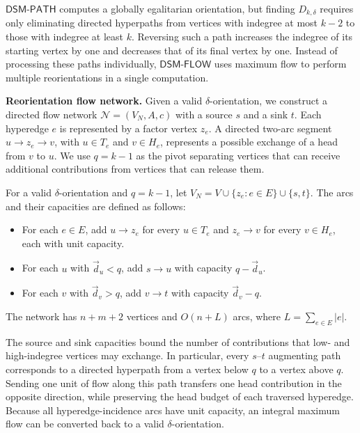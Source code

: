 \documentclass[twocolumn]{svjour3}
\newcommand{\kw}[1]{{\ensuremath{\mathsf{#1}}}\xspace}
\newcommand{\stitle}[1]{\par\noindent\textbf{#1}}
\begin{document}
\kw{DSM\text{-}PATH} computes a globally egalitarian orientation, but finding $D_{k,\delta}$ requires only eliminating directed hyperpaths from vertices with indegree at most $k-2$ to those with indegree at least $k$. Reversing such a path increases the indegree of its starting vertex by one and decreases that of its final vertex by one. Instead of processing these paths individually, \kw{DSM\text{-}FLOW} uses maximum flow to perform multiple reorientations in a single computation.

\stitle{Reorientation flow network.}
Given a valid $\delta$-orientation, we construct a directed flow network
$\mathcal N=(V_N,A,c)$ with a source $s$ and a sink $t$.
Each hyperedge $e$ is represented by a factor vertex $z_e$.
A directed two-arc segment $u\to z_e\to v$, with $u\in T_e$ and
$v\in H_e$, represents a possible exchange of a head from $v$ to $u$.
We use $q=k-1$ as the pivot separating vertices that can receive
additional contributions from vertices that can release them.

\begin{definition}\label{flow}
For a valid $\delta$-orientation and $q=k-1$, let
$V_N=V\cup\{z_e:e\in E\}\cup\{s,t\}$. The arcs and their capacities
are defined as follows:
\begin{itemize}[leftmargin=12pt,topsep=2pt,itemsep=1pt]
\item For each $e\in E$, add $u\to z_e$ for every $u\in T_e$ and
      $z_e\to v$ for every $v\in H_e$, each with unit capacity.
\item For each $u$ with $\vec d_u<q$, add $s\to u$ with capacity
      $q-\vec d_u$.
\item For each $v$ with $\vec d_v>q$, add $v\to t$ with capacity
      $\vec d_v-q$.
\end{itemize}
The network has $n+m+2$ vertices and $O(n+L)$ arcs, where
$L=\sum_{e\in E}|e|$.
\end{definition}

The source and sink capacities bound the number of contributions that
low- and high-indegree vertices may exchange. In particular, every
$s$--$t$ augmenting path corresponds to a directed hyperpath from a
vertex below $q$ to a vertex above $q$. Sending one unit of flow
along this path transfers one head contribution in the opposite
direction, while preserving the head budget of each traversed hyperedge.
Because all hyperedge-incidence arcs have unit capacity, an integral
maximum flow can be converted back to a valid $\delta$-orientation.
\end{document}
